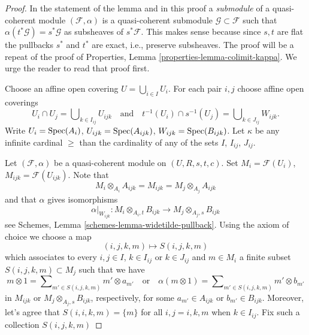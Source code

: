 \begin{proof}
In the statement of the lemma and in this proof
a {\it submodule} of a quasi-coherent module $(\mathcal{F}, \alpha)$
is a quasi-coherent submodule $\mathcal{G} \subset \mathcal{F}$
such that $\alpha(t^*\mathcal{G}) = s^*\mathcal{G}$ as subsheaves of
$s^*\mathcal{F}$. This makes sense because since $s, t$ are flat the
pullbacks $s^*$ and $t^*$ are exact, i.e., preserve subsheaves.
The proof will be a repeat of the proof of
Properties, Lemma \ref{properties-lemma-colimit-kappa}.
We urge the reader to read that proof first.

\medskip\noindent
Choose an affine open covering $U = \bigcup_{i \in I} U_i$.
For each pair $i, j$ choose affine open coverings
$$
U_i \cap U_j = \bigcup\nolimits_{k \in I_{ij}} U_{ijk}
\quad\text{and}\quad
t^{-1}(U_i) \cap s^{-1}(U_j) = \bigcup\nolimits_{k \in J_{ij}} W_{ijk}.
$$
Write $U_i = \mathop{\mathrm{Spec}}(A_i)$, $U_{ijk} = \mathop{\mathrm{Spec}}(A_{ijk})$,
$W_{ijk} = \mathop{\mathrm{Spec}}(B_{ijk})$.
Let $\kappa$ be any infinite cardinal $\geq$ than the cardinality
of any of the sets $I$, $I_{ij}$, $J_{ij}$.

\medskip\noindent
Let $(\mathcal{F}, \alpha)$ be a quasi-coherent module on $(U, R, s, t, c)$.
Set $M_i = \mathcal{F}(U_i)$, $M_{ijk} = \mathcal{F}(U_{ijk})$.
Note that
$$
M_i \otimes_{A_i} A_{ijk} = M_{ijk} = M_j \otimes_{A_j} A_{ijk}
$$
and that $\alpha$ gives isomorphisms
$$
\alpha|_{W_{ijk}} :
M_i \otimes_{A_i, t} B_{ijk}
\longrightarrow
M_j \otimes_{A_j, s} B_{ijk}
$$
see
Schemes, Lemma \ref{schemes-lemma-widetilde-pullback}.
Using the axiom of choice we choose a map
$$
(i, j, k, m) \mapsto S(i, j, k, m)
$$
which associates to every $i, j \in I$, $k \in I_{ij}$ or $k \in J_{ij}$
and $m \in M_i$ a finite subset $S(i, j, k, m) \subset M_j$
such that we have
$$
m \otimes 1 = \sum\nolimits_{m' \in S(i, j, k, m)} m' \otimes a_{m'}
\quad\text{or}\quad
\alpha(m \otimes 1) = \sum\nolimits_{m' \in S(i, j, k, m)} m' \otimes b_{m'}
$$
in $M_{ijk}$ or $M_j \otimes_{A_j, s} B_{ijk}$, respectively,
for some $a_{m'} \in A_{ijk}$ or $b_{m'} \in B_{ijk}$.
Moreover, let's agree that $S(i, i, k, m) = \{m\}$ for all
$i, j = i, k, m$ when $k \in I_{ij}$. Fix such a collection $S(i, j, k, m)$


\end{proof}
